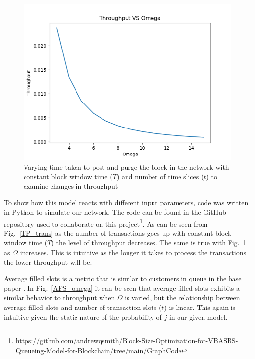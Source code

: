 \documentclass[conference]{IEEEtran}
\begin{document}
\begin{figure}[htbp]
    \centerline{\includegraphics[width=\linewidth]{Figures/ThoughtputVSOmegaConstTrnx.png}}
    \caption{Varying time taken to post and purge the block in the network with constant block window time ($T$) and number of time slices ($t$) to examine changes in throughput}
    \label{TP_omega}
\end{figure}

To show how this model reacts with different input parameters, code was written in Python
to simulate our network. The code can be found in the GitHub repository used to collaborate
on this project\footnote{https://github.com/andrewqsmith/Block-Size-Optimization-for-VBASBS-\\
Queueing-Model-for-Blockchain/tree/main/GraphCode}. As can be seen from Fig.~\ref{TP_trans}
as the number of transactions goes up with constant block window time ($T$) the level of throughput
decreases. The same is true with Fig.~\ref{TP_omega} as $\Omega$ increases. This is intuitive as 
the longer it takes to process the transactions the lower throughput will be.

Average filled slots is a metric that is similar to customers in queue in the base paper 
\cite{2020_ACM_Seol}. In Fig.~\ref{AFS_omega} it can be seen that average filled slots 
exhibits a similar behavior to throughput when $\Omega$ is varied, but the relationship 
between average filled slots and number of transaction slots ($t$) is linear. This again is 
intuitive given the static nature of the probability of $j$ in our given model. 
\end{document}
